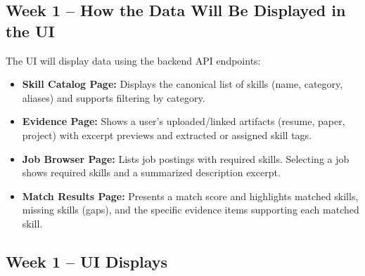 \documentclass[11pt]{article}
\begin{document}
\subsection*{Week 1 -- How the Data Will Be Displayed in the UI}
\noindent
The UI will display data using the backend API endpoints:
\begin{itemize}
  \item \textbf{Skill Catalog Page:} Displays the canonical list of skills (name, category, aliases) and supports filtering by category.
  \item \textbf{Evidence Page:} Shows a user’s uploaded/linked artifacts (resume, paper, project) with excerpt previews and extracted or assigned skill tags.
  \item \textbf{Job Browser Page:} Lists job postings with required skills. Selecting a job shows required skills and a summarized description excerpt.
  \item \textbf{Match Results Page:} Presents a match score and highlights matched skills, missing skills (gaps), and the specific evidence items supporting each matched skill.
\end{itemize}

\subsection*{Week 1 -- UI Displays}
\end{document}
